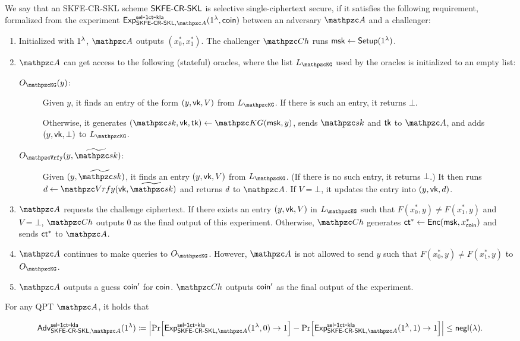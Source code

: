 \begin{definition}\label{def:sel-1ct-security_SKFE-SKL}
We say that an SKFE-CR-SKL scheme $\mathsf{SKFE}\textrm{-}\mathsf{CR}\textrm{-}\mathsf{SKL}$ is selective single-ciphertext secure, if
it satisfies the following requirement, formalized from the
experiment $\expc{\SKFESKL,\qA}{sel}{1ct}{kla}(1^\secp,\coin)$
between an adversary $\qA$ and a challenger:

\begin{enumerate}
\item Initialized with $1^\lambda$, $\qA$ outputs $(x_0^*,x_1^*)$. The challenger $\qCh$ runs $\mathsf{msk}\leftarrow\mathsf{Setup}(1^\lambda)$. 

\item $\qA$ can get access to the following (stateful) oracles,
where the list $\List{\qKG}$ used by the oracles is initialized
to an empty list:

\begin{description}
\item[$\Oracle{\qKG}(y)$:] Given $y$, it finds an entry of the form
$(y,\mathsf{vk},V)$ from $\List{\qKG}$. If there is such an entry, it
returns $\bot$.

Otherwise, it generates $(\qsk,\vk,\tk)\la\qKG(\msk,y)$, sends
$\qsk$ and $\mathsf{tk}$ to $\qA$, and adds $(y,\mathsf{vk},\bot)$ to $\List{\qKG}$.

\item[$\Oracle{\qVrfy}(y,\widetilde{\qsk})$:] Given
$(y,\widetilde{\qsk})$, it finds an entry $(y,\mathsf{vk},V)$ from
$\List{\qKG}$. (If there is no such entry, it returns $\bot$.) It
then runs $\decision \gets \qVrfy(\vk,\widetilde{\qsk})$ and returns
$d$ to $\qA$. If $V=\bot$, it updates the entry into
$(y,\mathsf{vk},d)$. 
\end{description}

\item $\qA$ requests the challenge ciphertext. If there exists
an entry $(y,\mathsf{vk},V)$ in $\List{\qKG}$ such that $F(x_0^*,y)\ne
F(x_1^*,y)$ and $V=\bot$, $\qCh$ outputs $0$ as the
final output of this experiment. Otherwise, $\qCh$ generates
$\mathsf{ct}^*\leftarrow\mathsf{Enc}(\mathsf{msk},x_{\mathsf{coin}}^*)$ and sends $\mathsf{ct}^*$ to $\qA$.

\item $\qA$ continues to make queries to $\Oracle{\qKG}$. However, $\qA$ is not allowed to send $y$ such that $F(x_0^*,y)\ne F(x_1^*,y)$ to $\Oracle{\qKG}$.

\item $\qA$ outputs a guess $\mathsf{coin}^\prime$ for $\mathsf{coin}$. $\qCh$
outputs $\mathsf{coin}'$ as the final output of the experiment.
\end{enumerate}

For any QPT $\qA$, it holds that

\begin{align}
\advc{\SKFESKL,\qA}{sel}{1ct}{kla}(1^\secp) \seteq \abs{\Pr[\expc{\SKFESKL,\qA}{sel}{1ct}{kla} (1^\secp,0) \ra 1] - \Pr[\expc{\SKFESKL,\qA}{sel}{1ct}{kla} (1^\secp,1) \ra 1] }\leq \negl(\secp).
\end{align} 
\end{definition}

